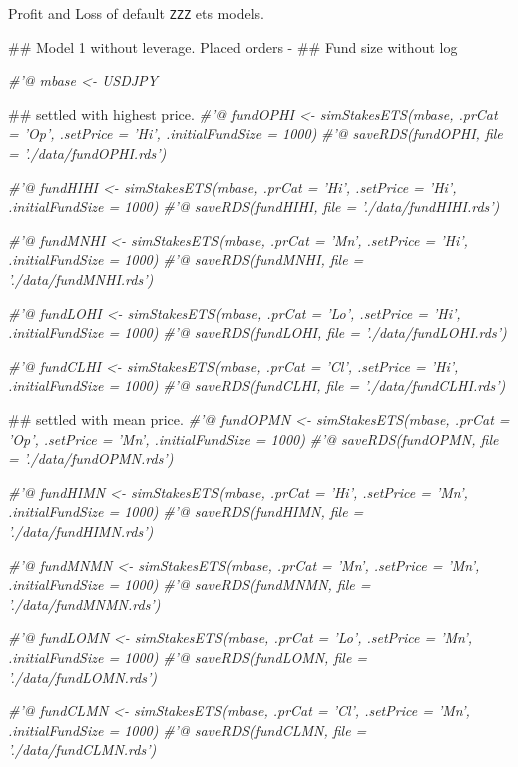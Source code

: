 \documentclass[]{tufte-book}
\newenvironment{Shaded}{}{}
\newcommand{\CommentTok}[1]{\textcolor[rgb]{0.38,0.63,0.69}{\textit{#1}}}
\newcommand{\NormalTok}[1]{#1}
\begin{document}
Profit and Loss of default \texttt{ZZZ} ets models.

\begin{Shaded}
\begin{Highlighting}[]
\NormalTok{## Model 1 without leverage.  Placed orders -}
\NormalTok{## Fund size without log}

\CommentTok{#'@ mbase <- USDJPY}

\NormalTok{## settled with highest price.}
\CommentTok{#'@ fundOPHI <- simStakesETS(mbase, .prCat = 'Op', .setPrice = 'Hi', .initialFundSize = 1000)}
\CommentTok{#'@ saveRDS(fundOPHI, file = './data/fundOPHI.rds')}

\CommentTok{#'@ fundHIHI <- simStakesETS(mbase, .prCat = 'Hi', .setPrice = 'Hi', .initialFundSize = 1000)}
\CommentTok{#'@ saveRDS(fundHIHI, file = './data/fundHIHI.rds')}

\CommentTok{#'@ fundMNHI <- simStakesETS(mbase, .prCat = 'Mn', .setPrice = 'Hi', .initialFundSize = 1000)}
\CommentTok{#'@ saveRDS(fundMNHI, file = './data/fundMNHI.rds')}

\CommentTok{#'@ fundLOHI <- simStakesETS(mbase, .prCat = 'Lo', .setPrice = 'Hi', .initialFundSize = 1000)}
\CommentTok{#'@ saveRDS(fundLOHI, file = './data/fundLOHI.rds')}

\CommentTok{#'@ fundCLHI <- simStakesETS(mbase, .prCat = 'Cl', .setPrice = 'Hi', .initialFundSize = 1000)}
\CommentTok{#'@ saveRDS(fundCLHI, file = './data/fundCLHI.rds')}


\NormalTok{## settled with mean price.}
\CommentTok{#'@ fundOPMN <- simStakesETS(mbase, .prCat = 'Op', .setPrice = 'Mn', .initialFundSize = 1000)}
\CommentTok{#'@ saveRDS(fundOPMN, file = './data/fundOPMN.rds')}

\CommentTok{#'@ fundHIMN <- simStakesETS(mbase, .prCat = 'Hi', .setPrice = 'Mn', .initialFundSize = 1000)}
\CommentTok{#'@ saveRDS(fundHIMN, file = './data/fundHIMN.rds')}

\CommentTok{#'@ fundMNMN <- simStakesETS(mbase, .prCat = 'Mn', .setPrice = 'Mn', .initialFundSize = 1000)}
\CommentTok{#'@ saveRDS(fundMNMN, file = './data/fundMNMN.rds')}

\CommentTok{#'@ fundLOMN <- simStakesETS(mbase, .prCat = 'Lo', .setPrice = 'Mn', .initialFundSize = 1000)}
\CommentTok{#'@ saveRDS(fundLOMN, file = './data/fundLOMN.rds')}

\CommentTok{#'@ fundCLMN <- simStakesETS(mbase, .prCat = 'Cl', .setPrice = 'Mn', .initialFundSize = 1000)}
\CommentTok{#'@ saveRDS(fundCLMN, file = './data/fundCLMN.rds')}



\end{Highlighting}
\end{Shaded}
\end{document}

